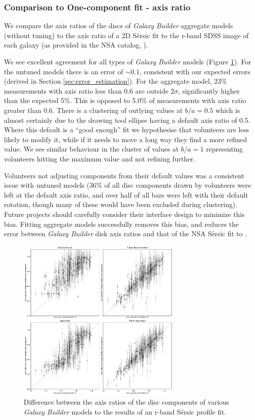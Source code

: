 \documentclass[../main.tex]{subfiles}
\begin{document}
\subsubsection{Comparison to One-component fit - axis ratio}
We compare the axis ratios of the discs of \textit{Galaxy Builder} aggregate models (without tuning) to the axis ratio of a 2D S\'ersic fit to the r-band SDSS image of each galaxy (as provided in the NSA catalog, \citealt{2011AJ....142...31B}).

We see excellent agreement for all types of \textit{Galaxy Builder} models (Figure \ref{fig:ax_ratio_comparison}). For the untuned models there is an error of $\sim0.1$, consistent with our expected errors (derived in Section \ref{sec:error_estimation}). For the aggregate model, 23\% measurements with axis ratio less than 0.6 are outside $2\sigma$, significantly higher than the expected 5\%. This is opposed to 5.0\% of measurements with axis ratio greater than 0.6. There is a clustering of outlying values at $b/a=0.5$ which is almost certainly due to the drawing tool ellipse having a default axis ratio of 0.5. Where this default is a ``good enough'' fit we hypothesise that volunteers are less likely to modify it, while if it needs to move a long way they find a more refined value. We see similar behaviour in the cluster of values at $b/a=1$ representing volunteers hitting the maximum value and not refining further.

Volunteers not adjusting components from their default values was a consistent issue with untuned models (36\% of all disc components drawn by volunteers were left at the default axis ratio, and over half of all bars were left with their default rotation, though many of these would have been excluded during clustering). Future projects should carefully consider their interface design to minimize this bias. Fitting aggregate models successfully removes this bias, and reduces the error between \textit{Galaxy Builder} disk axis ratios and that of the NSA S\'ersic fit to .

\begin{figure}
  \includegraphics[width=8cm]{images__results/gzb-agg-nsa-comparison_all.pdf}
  \caption{Difference between the axis ratios of the disc components of various \textit{Galaxy Builder} models to the results of an r-band S\'ersic profile fit.}
  \label{fig:ax_ratio_comparison}
\end{figure}
\end{document}
